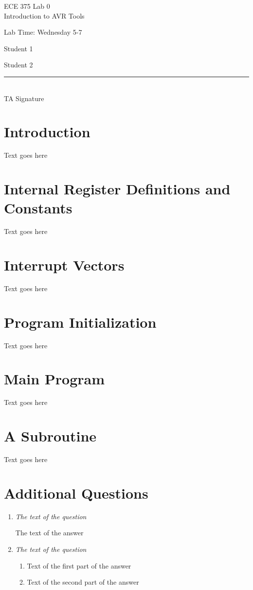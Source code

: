 \documentclass[12pt,letterpaper]{article}
\begin{document}
\begin{titlepage}
	\vspace*{4cm}
	\begin{flushright}
	{\huge
		ECE 375 Lab 0\\[1cm]
	}
	{\large
		Introduction to AVR Tools
	}
	\end{flushright}
	\begin{flushleft}
	Lab Time: Wednesday 5-7
	\end{flushleft}
	\begin{flushright}
	Student 1

	Student 2
	\vfill
	\rule{5in}{.5mm}\\
	TA Signature
	\end{flushright}

\end{titlepage}

\section{Introduction}
Text goes here

\section{Internal Register Definitions and Constants}
Text goes here

\section{Interrupt Vectors}
Text goes here

\section{Program Initialization}
Text goes here

\section{Main Program}
Text goes here

\section{A Subroutine}
Text goes here

\section{Additional Questions}
\begin{enumerate}
	\item \textit{The text of the question}

	The text of the answer

	\item \textit{The text of the question}
	\begin{enumerate}
		\item
		Text of the first part of the answer

		\item
		Text of the second part of the answer
	\end{enumerate}

\end{enumerate}
\end{document}
